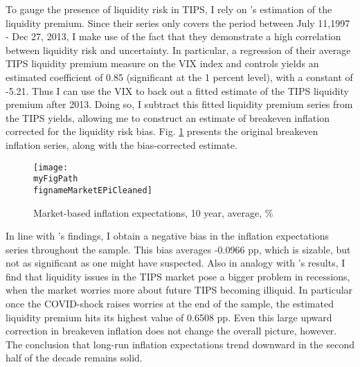 \documentclass[11pt]{article}
\def \myFigPath {../../figures/}
\renewcommand{\[}{\begin{equation}}
\renewcommand{\]}{\end{equation}}
\def\myFigScale{0.3}
\def\fignameMarketEPiCleaned{cleaned_epi10_2020_07_28}
\begin{document}
To gauge the presence of liquidity risk in TIPS, I rely on \cite{andreasen2018tips}'s estimation of the liquidity premium. Since their series only covers the period between July 11,1997 - Dec 27, 2013, I make use of the fact that they demonstrate a high correlation between liquidity risk and uncertainty. In particular, a regression of their average TIPS liquidity premium measure on the VIX index and controls yields an estimated coefficient of 0.85 (significant at the 1 percent level), with a constant of -5.21. Thus I can use the VIX to back out a fitted \cite{andreasen2018tips} estimate of the TIPS liquidity premium after 2013. Doing so, I subtract this fitted liquidity premium series from the TIPS yields, allowing me to construct an estimate of breakeven inflation corrected for the liquidity risk bias. Fig. \ref{epi_cleaned} presents the original breakeven inflation series, along with the bias-corrected estimate.

\begin{figure}[h!]
\texttt{[image: \\myFigPath \\fignameMarketEPiCleaned]} %
\caption{Market-based inflation expectations, 10 year, average, \%}
\label{epi_cleaned}
\end{figure}

In line with \cite{andreasen2018tips}'s findings, I obtain a negative bias in the inflation expectations series throughout the sample. This bias averages -0.0966 pp, which is sizable, but not as significant as one might have suspected. Also in analogy with \cite{andreasen2018tips}'s results, I find that liquidity issues in the TIPS market pose a bigger problem in recessions, when the market worries more about future TIPS becoming illiquid. In particular once the COVID-shock raises worries at the end of the sample, the estimated liquidity premium hits its highest value of 0.6508 pp. Even this large upward correction in breakeven inflation does not change the overall picture, however. The conclusion that long-run inflation expectations trend downward in the second half of the decade remains solid. 
\end{document}
